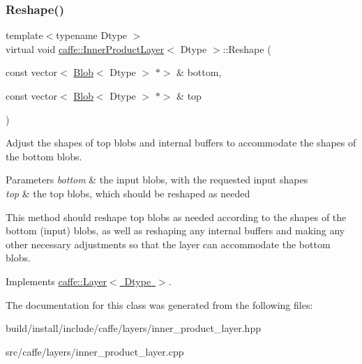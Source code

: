\subsubsection{\texorpdfstring{Reshape()}{Reshape()}\hspace{0.1cm}{\footnotesize\ttfamily [2/2]}}
{\footnotesize\ttfamily template$<$typename Dtype $>$ \\
virtual void \mbox{\hyperlink{classcaffe_1_1_inner_product_layer}{caffe\+::\+Inner\+Product\+Layer}}$<$ Dtype $>$\+::Reshape (\begin{DoxyParamCaption}\item[{const vector$<$ \mbox{\hyperlink{classcaffe_1_1_blob}{Blob}}$<$ Dtype $>$ $\ast$$>$ \&}]{bottom,  }\item[{const vector$<$ \mbox{\hyperlink{classcaffe_1_1_blob}{Blob}}$<$ Dtype $>$ $\ast$$>$ \&}]{top }\end{DoxyParamCaption})\hspace{0.3cm}{\ttfamily [virtual]}}



Adjust the shapes of top blobs and internal buffers to accommodate the shapes of the bottom blobs. 


\begin{DoxyParams}{Parameters}
{\em bottom} & the input blobs, with the requested input shapes \\
\hline
{\em top} & the top blobs, which should be reshaped as needed\\
\hline
\end{DoxyParams}
This method should reshape top blobs as needed according to the shapes of the bottom (input) blobs, as well as reshaping any internal buffers and making any other necessary adjustments so that the layer can accommodate the bottom blobs. 

Implements \mbox{\hyperlink{classcaffe_1_1_layer_a7fe981e8af8d93d587acf2a952be563d}{caffe\+::\+Layer$<$ Dtype $>$}}.



The documentation for this class was generated from the following files\+:\begin{DoxyCompactItemize}
\item 
build/install/include/caffe/layers/inner\+\_\+product\+\_\+layer.\+hpp\item 
src/caffe/layers/inner\+\_\+product\+\_\+layer.\+cpp\end{DoxyCompactItemize}
